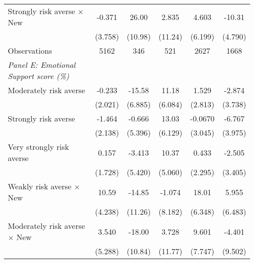 {\begin{longtable}{l*{5}{c}}
Strongly risk averse $\times$ New&      -0.371         &       26.00\sym{**} &       2.835         &       4.603         &      -10.31\sym{**} \\
                    &     (3.758)         &     (10.98)         &     (11.24)         &     (6.199)         &     (4.790)         \\
\midrule
Observations        &        5162         &         346         &         521         &        2627         &        1668         \\


\midrule
\textit{Panel E: Emotional Support score (\%)} & & & & & \\
Moderately risk averse&      -0.233         &      -15.58\sym{**} &       11.18\sym{*}  &       1.529         &      -2.874         \\
                    &     (2.021)         &     (6.885)         &     (6.084)         &     (2.813)         &     (3.738)         \\

Strongly risk averse&      -1.464         &      -0.666         &       13.03\sym{**} &     -0.0670         &      -6.767\sym{*}  \\
                    &     (2.138)         &     (5.396)         &     (6.129)         &     (3.045)         &     (3.975)         \\

Very strongly risk averse&       0.157         &      -3.413         &       10.37\sym{**} &       0.433         &      -2.505         \\
                    &     (1.728)         &     (5.420)         &     (5.060)         &     (2.295)         &     (3.405)         \\

Weakly risk averse $\times$ New&       10.59\sym{**} &      -14.85         &      -1.074         &       18.01\sym{***}&       5.955         \\
                    &     (4.238)         &     (11.26)         &     (8.182)         &     (6.348)         &     (6.483)         \\

Moderately risk averse $\times$ New&       3.540         &      -18.00         &       3.728         &       9.601         &      -4.401         \\
                    &     (5.288)         &     (10.84)         &     (11.77)         &     (7.747)         &     (9.502)         \\


\end{longtable}}
